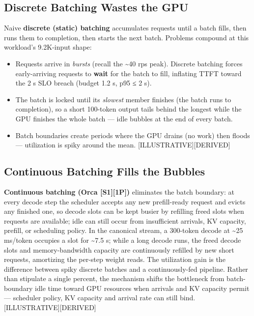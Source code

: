 \subsection{Discrete Batching Wastes the
GPU}\label{discrete-batching-wastes-the-gpu}

Naive \textbf{discrete (static) batching} accumulates requests until a
batch fills, then runs them to completion, then starts the next batch.
Problems compound at this workload's 9.2K-input shape:

\begin{itemize}
\tightlist
\item
  Requests arrive in \emph{bursts} (recall the \textasciitilde40 rps
  peak). Discrete batching forces early-arriving requests to
  \textbf{wait} for the batch to fill, inflating TTFT toward the 2 s SLO
  breach (budget 1.2 s, p95 ≤ 2 s).
\item
  The batch is locked until its \emph{slowest} member finishes (the
  batch runs to completion), so a short 100-token output tails behind
  the longest while the GPU finishes the whole batch --- idle bubbles at
  the end of every batch.
\item
  Batch boundaries create periods where the GPU drains (no work) then
  floods --- utilization is spiky around the mean.
  \mbox{{[}ILLUSTRATIVE{]}}\hspace{0pt}\mbox{{[}DERIVED{]}}
\end{itemize}

\subsection{Continuous Batching Fills the
Bubbles}\label{continuous-batching-fills-the-bubbles}

\textbf{Continuous batching (Orca \mbox{{[}S1{]}}\hspace{0pt}\mbox{{[}1P{]}})} eliminates the
batch boundary: at every decode step the scheduler accepts any new
prefill-ready request and evicts any finished one, so decode slots can
be kept busier by refilling freed slots when requests are available;
idle can still occur from insufficient arrivals, KV capacity, prefill,
or scheduling policy. In the canonical stream, a 300-token decode at
\textasciitilde25 ms/token occupies a slot for \textasciitilde7.5 s;
while a long decode runs, the freed decode slots and memory-bandwidth
capacity are continuously refilled by new short requests, amortizing the
per-step weight reads. The utilization gain is the difference between
spiky discrete batches and a continuously-fed pipeline. Rather than
stipulate a single percent, the mechanism shifts the bottleneck from
batch-boundary idle time toward GPU resources when arrivals and KV
capacity permit --- scheduler policy, KV capacity and arrival rate can
still bind. \mbox{{[}ILLUSTRATIVE{]}}\hspace{0pt}\mbox{{[}DERIVED{]}}

